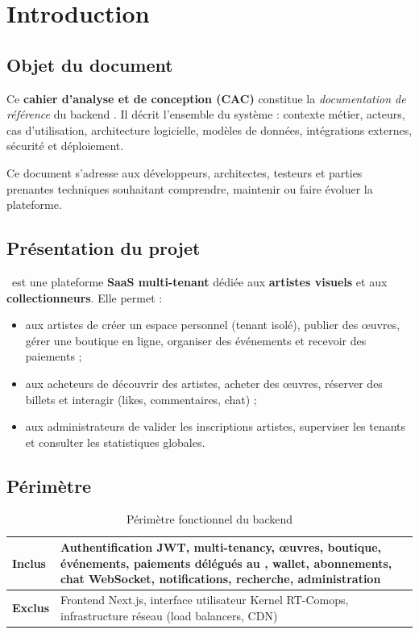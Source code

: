 \chapter{Introduction}

\section{Objet du document}

Ce \textbf{cahier d'analyse et de conception (CAC)} constitue la \emph{documentation de référence}
du backend \yow. Il décrit l'ensemble du système : contexte métier, acteurs, cas d'utilisation,
architecture logicielle, modèles de données, intégrations externes, sécurité et déploiement.

Ce document s'adresse aux développeurs, architectes, testeurs et parties prenantes techniques
souhaitant comprendre, maintenir ou faire évoluer la plateforme.

\section{Présentation du projet}

\yow\ est une plateforme \textbf{SaaS multi-tenant} dédiée aux \textbf{artistes visuels} et aux
\textbf{collectionneurs}. Elle permet :

\begin{itemize}[noitemsep]
  \item aux artistes de créer un espace personnel (tenant isolé), publier des œuvres, gérer une boutique en ligne, organiser des événements et recevoir des paiements ;
  \item aux acheteurs de découvrir des artistes, acheter des œuvres, réserver des billets et interagir (likes, commentaires, chat) ;
  \item aux administrateurs de valider les inscriptions artistes, superviser les tenants et consulter les statistiques globales.
\end{itemize}

\section{Périmètre}

\begin{table}[h]
  \centering
  \caption{Périmètre fonctionnel du backend}
  \label{tab:perimetre}
  \begin{tabular}{@{}lp{10cm}@{}}
    \toprule
    \textbf{Inclus} & Authentification JWT, multi-tenancy, œuvres, boutique, événements, paiements délégués au , wallet, abonnements, chat WebSocket, notifications, recherche, administration \\
    \midrule
    \textbf{Exclus} & Frontend Next.js, interface utilisateur Kernel RT-Comops, infrastructure réseau (load balancers, CDN) \\
    \bottomrule
  \end{tabular}
\end{table}

